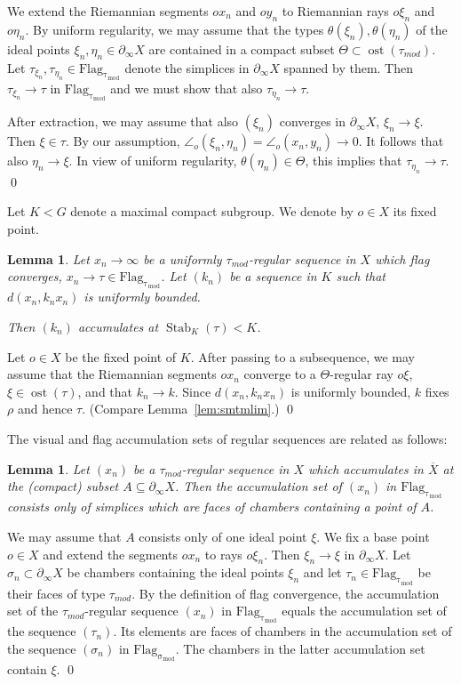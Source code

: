 \documentclass[12pt]{article}
\theoremstyle{boldplain}
\newtheorem{lem}[equation]{Lemma}
\theoremstyle{bolddefinition}
\numberwithin{equation}{section}
\def\si{\sigma}
\def\Flags{\operatorname{Flag_{\si_{mod}}}}
\def\Flagt{\operatorname{Flag_{\tau_{mod}}}}
\def\geo{\partial_{\infty}}
\def\ol{\overline}
\def\ost{\operatorname{ost}}
\def\Stab{\operatorname{Stab}}
\def\taumod{\tau_{mod}}
\begin{document}
We extend the Riemannian segments $ox_n$ and $oy_n$ to Riemannian rays $o\xi_n$ and $o\eta_n$.
By uniform regularity,
we may assume that the types $\theta(\xi_n),\theta(\eta_n)$ of the ideal points $\xi_n,\eta_n\in\geo X$ 
are contained in a compact subset $\Theta\subset\ost(\taumod)$.
Let $\tau_{\xi_n},\tau_{\eta_n}\in\Flagt$ denote the simplices in $\geo X$ spanned by them.
Then $\tau_{\xi_n}\to\tau$ in $\Flagt$ and we must show that also $\tau_{\eta_n}\to\tau$.

After extraction, we may assume that also $(\xi_n)$ converges in $\geo X$, $\xi_n\to\xi$.
Then $\xi\in\tau$. 
By our assumption, $\angle_o(\xi_n,\eta_n)=\angle_o(x_n,y_n)\to0$.
It follows that also $\eta_n\to\xi$. 
In view of uniform regularity, $\theta(\eta_n)\in\Theta$, this implies that $\tau_{\eta_n}\to\tau$.
\qed

\medskip

Let $K<G$ denote a maximal compact subgroup.
We denote by $o\in X$ its fixed point. 
\begin{lem}
\label{lem:nbrgsqcs}
Let $x_n\to\infty$ be a uniformly $\taumod$-regular sequence in $X$ which flag converges, $x_n\to\tau\in\Flagt$.
Let $(k_n)$ be a sequence in $K$ such that $d(x_n,k_nx_n)$ is uniformly bounded. 

Then $(k_n)$ accumulates at $\Stab_K(\tau)<K$.
\end{lem}
\proof
Let $o\in X$ be the fixed point of $K$.
After passing to a subsequence,
we may assume that the Riemannian segments $ox_n$ converge to a $\Theta$-regular ray $o\xi$, $\xi\in\ost(\tau)$,
and that $k_n\to k$. 
Since $d(x_n,k_nx_n)$ is uniformly bounded, $k$ fixes $\rho$ and hence $\tau$.
(Compare Lemma~\ref{lem:smtmlim}.)
\qed


\medskip
The visual and flag accumulation sets of regular sequences are related as follows:

\begin{lem}
\label{lem:vsaccsrgsq}
Let  $(x_n)$ be a 
$\taumod$-regular sequence in $X$ 
which accumulates in $\ol X$ at the (compact) subset $A\subseteq\geo X$.
Then the accumulation set of $(x_n)$ in $\Flagt$ consists only of simplices
which are faces of chambers containing a point of $A$.
\end{lem}
\proof
We may assume that $A$ consists only of one ideal point $\xi$.
We fix a base point $o\in X$ and extend the segments $ox_n$ to rays $o\xi_n$.
Then $\xi_n\to\xi$ in $\geo X$.
Let $\si_n\subset\geo X$ be chambers containing the ideal points $\xi_n$
and let $\tau_n\in\Flagt$ be their faces of type $\taumod$. 
By the definition of flag convergence,
the accumulation set of the $\taumod$-re\-gu\-lar sequence $(x_n)$ in $\Flagt$ equals the accumulation set of the sequence $(\tau_n)$.
Its elements are faces of chambers in the accumulation set of the sequence $(\si_n)$ in $\Flags$.
The chambers in the latter accumulation set contain $\xi$. 
\qed
\end{document}
